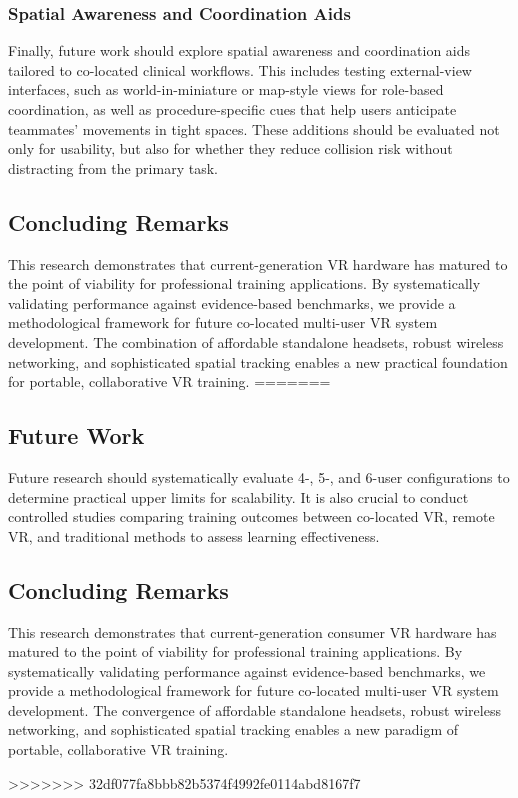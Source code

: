 \subsubsection{Spatial Awareness and Coordination Aids}
Finally, future work should explore spatial awareness and coordination aids tailored to co-located clinical workflows. This includes testing external-view interfaces, such as world-in-miniature or map-style views for role-based coordination, as well as procedure-specific cues that help users anticipate teammates' movements in tight spaces. These additions should be evaluated not only for usability, but also for whether they reduce collision risk without distracting from the primary task.


\subsection{Concluding Remarks}

This research demonstrates that current-generation VR hardware has matured to the point of viability for professional training applications. By systematically validating performance against evidence-based benchmarks, we provide a methodological framework for future co-located multi-user VR system development. The combination of affordable standalone headsets, robust wireless networking, and sophisticated spatial tracking enables a new practical foundation for portable, collaborative VR training.
=======

\subsection{Future Work}

Future research should systematically evaluate 4-, 5-, and 6-user configurations to determine practical upper limits for scalability. It is also crucial to conduct controlled studies comparing training outcomes between co-located VR, remote VR, and traditional methods to assess learning effectiveness.

\subsection{Concluding Remarks}

This research demonstrates that current-generation consumer VR hardware has matured to the point of viability for professional training applications. By systematically validating performance against evidence-based benchmarks, we provide a methodological framework for future co-located multi-user VR system development. The convergence of affordable standalone headsets, robust wireless networking, and sophisticated spatial tracking enables a new paradigm of portable, collaborative VR training.

>>>>>>> 32df077fa8bbb82b5374f4992fe0114abd8167f7

